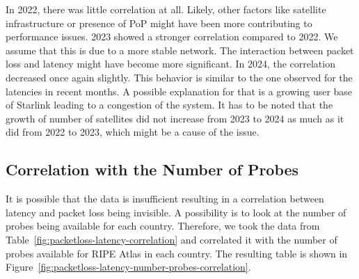 In 2022, there was little correlation at all. Likely, other factors like
satellite infrastructure or presence of \ac{PoP} might have been more
contributing to performance issues. 2023 showed a stronger correlation compared
to 2022. We assume that this is due to a more stable network. The interaction
between packet loss and latency might have become more significant. In 2024,
the correlation decreased once again slightly. This behavior is similar to the
one observed for the latencies in recent months. A possible explanation for
that is a growing user base of Starlink leading to a congestion of the system.
It has to be noted that the growth of number of satellites did not increase
from 2023 to 2024 as much as it did from 2022 to 2023, which might be a cause
of the issue.

\subsection*{Correlation with the Number of Probes} \label{sec:number-of-probes-correlation}

It is possible that the data is insufficient resulting in a correlation between
latency and packet loss being invisible. A possibility is to look at the number
of probes being available for each country. Therefore, we took the data from
Table~\ref{fig:packetloss-latency-correlation} and correlated it with the
number of probes available for RIPE Atlas in each country. The resulting table
is shown in Figure~\ref{fig:packetloss-latency-number-probes-correlation}.

